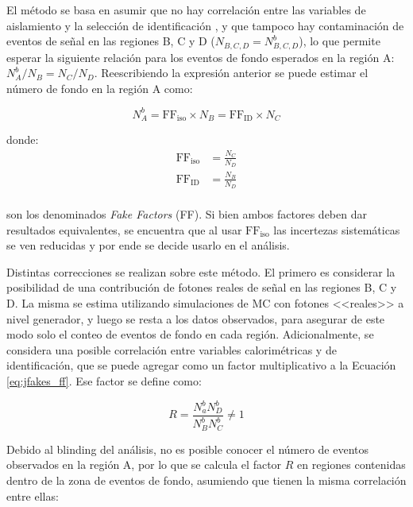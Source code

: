 El método se basa en asumir que no hay correlación entre las variables de aislamiento y la selección de identificación \cite{tesis_tony}, y que tampoco hay contaminación de eventos de señal en las regiones B, C y D ($N_{B,C,D}=N_{B,C,D}^b$), lo que permite esperar la siguiente relación para los eventos de fondo esperados en la región A: $N_A^b / N_B = N_C/N_D$. 
Reescribiendo la expresión anterior se puede estimar el número de fondo en la región A como:

\begin{equation}
  N_A^b = \text{FF}_{\text{iso}}\times N_B = \text{FF}_{\text{ID}}\times N_C
  \label{eq:jfakes_ff}
\end{equation}

\noindent
donde:
\begin{equation}
  \begin{split}
    \text{FF}_{\text{iso}} &= \frac{N_C}{N_D} \\
    \text{FF}_{\text{ID}} &= \frac{N_B}{N_D} \\
  \end{split}
\end{equation}

\noindent
son los denominados \textit{Fake Factors} (FF). 
Si bien ambos factores deben dar resultados equivalentes, se encuentra que al usar $\text{FF}_{\text{iso}}$ las incertezas sistemáticas se ven reducidas y por ende se decide usarlo en el análisis.

Distintas correcciones se realizan sobre este método. El primero es considerar la posibilidad de una contribución de fotones reales de señal en las regiones B, C y D. La misma se estima utilizando simulaciones de MC con fotones <<reales>> a nivel generador, y luego se resta a los datos observados, para asegurar de este modo solo el conteo de eventos de fondo en cada región. Adicionalmente, se considera una posible correlación entre variables calorimétricas y de identificación, que se puede agregar como un factor multiplicativo a la Ecuación \ref{eq:jfakes_ff}. Ese factor se define como:

\begin{equation}
  R = \frac{N_a^b N_D^b}{N_B^b N_C^b} \neq 1
\end{equation}

Debido al blinding del análisis, no es posible conocer el número de eventos observados en la región A, por lo que se calcula el factor $R$ en regiones contenidas dentro de la zona de eventos de fondo, asumiendo que tienen la misma correlación entre ellas:

